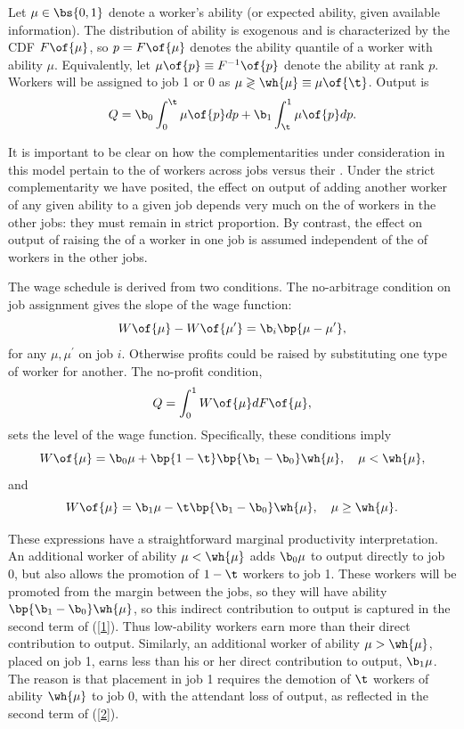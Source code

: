 \documentclass[12pt]{article}
\newcommand{\highlightP}[1]{{\emph{\color{MyPink}{#1}}}}
\theoremstyle{definition}
\begin{document}
Let $\mu \in \bs{0,1}$ denote a worker's ability (or expected ability, given available information). The distribution of ability is exogenous and is characterized by the CDF $F\of{\mu}$, so $p = F\of{\mu}$ denotes the ability quantile of a worker with ability $\mu$. Equivalently, let $\mu\of{p} \equiv F^{-1}\of{p}$ denote the ability at rank $p$. Workers will be assigned to job 1 or 0 as $\mu \gtrless \wh{\mu} \equiv \mu\of{\t}$. Output is 
\begin{equation}
    \notag 
    Q = \b_0 \int_{0}^{\t} \mu\of{p} dp + \b_1 \int_{\t}^{1} \mu\of{p} dp. 
\end{equation}

It is important to be clear on how the complementarities under consideration in this model pertain to the \highlightP{number} of workers across jobs versus their \highlightP{abilities}. Under the strict complementarity we have posited, the effect on output of adding another worker of any given ability to a given job depends very much on the \highlightP{number} of workers in the other jobs: they must remain in strict proportion. By contrast, the effect on output of raising the \highlightP{ability} of a worker in one job is assumed independent of the \highlightP{abilities} of workers in the other jobs. 

The wage schedule is derived from two conditions. The no-arbitrage condition on job assignment gives the slope of the wage function: 
$$
W\of{\mu} - W\of{\mu^{\prime}} = \b_i \bp{\mu - \mu^{\prime}},
$$
for any $\mu, \mu^{\prime}$ on job $i$. Otherwise profits could be raised by substituting one type of worker for another. The no-profit condition, 
$$
Q = \int_{0}^{1} W\of{\mu} d F\of{\mu},
$$
sets the level of the wage function. Specifically, these conditions imply 
\begin{equation}
    \label{1}
    W\of{\mu} = \b_0 \mu + \bp{1-\t} \bp{\b_1 - \b_0} \wh{\mu},\quad \mu < \wh{\mu},
\end{equation}
and 
\begin{equation}
    \label{2}
    W\of{\mu} = \b_1 \mu - \t \bp{\b_1 - \b_0} \wh{\mu}, \quad \mu \geq \wh{\mu}.
\end{equation}

These expressions have a straightforward marginal productivity interpretation. An additional worker of ability $\mu < \wh{\mu}$ adds $\b_0 \mu$ to output directly to job 0, but also allows the promotion of $1-\t$ workers to job 1. These workers will be promoted from the margin between the jobs, so they will have ability $\bp{\b_1 - \b_0} \wh{\mu}$, so this indirect contribution to output is captured in the second term of (\ref{1}). Thus low-ability workers earn more than their direct contribution to output. Similarly, an additional worker of ability $\mu > \wh{\mu}$, placed on job 1, earns less than his or her direct contribution to output, $\b_1 \mu$. The reason is that placement in job 1 requires the demotion of $\t$ workers of ability $\wh{\mu}$ to job 0, with the attendant loss of output, as reflected in the second term of (\ref{2}).
\end{document}
